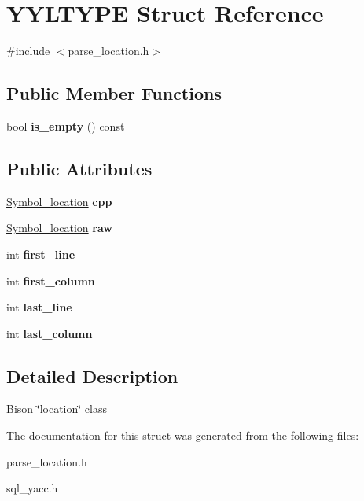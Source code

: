 \hypertarget{structYYLTYPE}{}\section{Y\+Y\+L\+T\+Y\+PE Struct Reference}
\label{structYYLTYPE}


{\ttfamily \#include $<$parse\+\_\+location.\+h$>$}

\subsection*{Public Member Functions}
\begin{DoxyCompactItemize}
\item 
\mbox{\label{structYYLTYPE_aeab7c73c3f4bc610ffa615f589273c2e}} 
bool {\bfseries is\+\_\+empty} () const
\end{DoxyCompactItemize}
\subsection*{Public Attributes}
\begin{DoxyCompactItemize}
\item 
\mbox{\label{structYYLTYPE_aaa59c4b4b671d3f6c825fd935b634bb3}} 
\mbox{\hyperlink{structSymbol__location}{Symbol\+\_\+location}} {\bfseries cpp}
\item 
\mbox{\label{structYYLTYPE_a97d7934c98181930d808d9e87f2c652c}} 
\mbox{\hyperlink{structSymbol__location}{Symbol\+\_\+location}} {\bfseries raw}
\item 
\mbox{\label{structYYLTYPE_a50ad3435eaea74bcab6f1ae5fbaefd89}} 
int {\bfseries first\+\_\+line}
\item 
\mbox{\label{structYYLTYPE_a3a556533babab1b9066fa9bdbb809210}} 
int {\bfseries first\+\_\+column}
\item 
\mbox{\label{structYYLTYPE_a3075f2bc3448df5d2a9f16d22bff2cc1}} 
int {\bfseries last\+\_\+line}
\item 
\mbox{\label{structYYLTYPE_acf87f8c98686f286eaf700c4b62157b2}} 
int {\bfseries last\+\_\+column}
\end{DoxyCompactItemize}


\subsection{Detailed Description}
Bison \char`\"{}location\char`\"{} class 

The documentation for this struct was generated from the following files\+:\begin{DoxyCompactItemize}
\item 
parse\+\_\+location.\+h\item 
sql\+\_\+yacc.\+h\end{DoxyCompactItemize}
